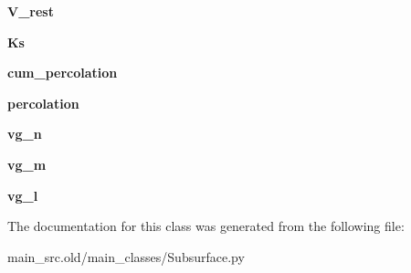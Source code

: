 \begin{DoxyCompactItemize}
\item 
\hypertarget{classmain__src_8old_1_1main__classes_1_1Subsurface_1_1SubArrs_ae0f60e567503b7821a8adb0218e3cc10}{{\bfseries V\-\_\-rest}}\label{classmain__src_8old_1_1main__classes_1_1Subsurface_1_1SubArrs_ae0f60e567503b7821a8adb0218e3cc10}

\item 
\hypertarget{classmain__src_8old_1_1main__classes_1_1Subsurface_1_1SubArrs_ab660b18cc3d2e02a37cca4c76e0656fa}{{\bfseries Ks}}\label{classmain__src_8old_1_1main__classes_1_1Subsurface_1_1SubArrs_ab660b18cc3d2e02a37cca4c76e0656fa}

\item 
\hypertarget{classmain__src_8old_1_1main__classes_1_1Subsurface_1_1SubArrs_ab036f7c25562d09ebd0952382026567d}{{\bfseries cum\-\_\-percolation}}\label{classmain__src_8old_1_1main__classes_1_1Subsurface_1_1SubArrs_ab036f7c25562d09ebd0952382026567d}

\item 
\hypertarget{classmain__src_8old_1_1main__classes_1_1Subsurface_1_1SubArrs_a32f7a7b22c94f59c966a08bf7eb63af7}{{\bfseries percolation}}\label{classmain__src_8old_1_1main__classes_1_1Subsurface_1_1SubArrs_a32f7a7b22c94f59c966a08bf7eb63af7}

\item 
\hypertarget{classmain__src_8old_1_1main__classes_1_1Subsurface_1_1SubArrs_abf5007e1320fcfeb641d35f5e923f359}{{\bfseries vg\-\_\-n}}\label{classmain__src_8old_1_1main__classes_1_1Subsurface_1_1SubArrs_abf5007e1320fcfeb641d35f5e923f359}

\item 
\hypertarget{classmain__src_8old_1_1main__classes_1_1Subsurface_1_1SubArrs_a84f6061126e91c24314f64ad7e0164ae}{{\bfseries vg\-\_\-m}}\label{classmain__src_8old_1_1main__classes_1_1Subsurface_1_1SubArrs_a84f6061126e91c24314f64ad7e0164ae}

\item 
\hypertarget{classmain__src_8old_1_1main__classes_1_1Subsurface_1_1SubArrs_aa255bc5e7261afd764333231d4630e03}{{\bfseries vg\-\_\-l}}\label{classmain__src_8old_1_1main__classes_1_1Subsurface_1_1SubArrs_aa255bc5e7261afd764333231d4630e03}

\end{DoxyCompactItemize}


The documentation for this class was generated from the following file\-:\begin{DoxyCompactItemize}
\item 
main\-\_\-src.\-old/main\-\_\-classes/Subsurface.\-py\end{DoxyCompactItemize}
